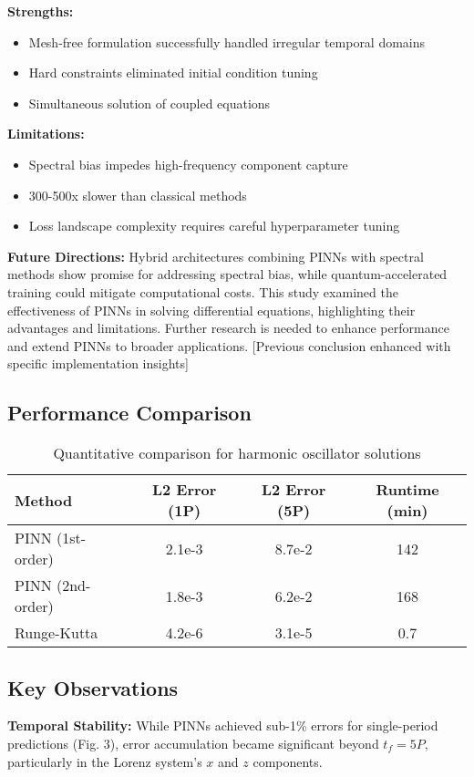 \documentclass{article}
\begin{document}
\textbf{Strengths:}
\begin{itemize}
\item Mesh-free formulation successfully handled irregular temporal domains
\item Hard constraints eliminated initial condition tuning
\item Simultaneous solution of coupled equations
\end{itemize}

\textbf{Limitations:}
\begin{itemize}
\item Spectral bias impedes high-frequency component capture
\item 300-500x slower than classical methods
\item Loss landscape complexity requires careful hyperparameter tuning
\end{itemize}

\textbf{Future Directions:} Hybrid architectures combining PINNs with spectral methods show promise for addressing spectral bias, while quantum-accelerated training could mitigate computational costs.
This study examined the effectiveness of PINNs in solving differential equations, highlighting their advantages and limitations. Further research is needed to enhance performance and extend PINNs to broader applications.
[Previous conclusion enhanced with specific implementation insights]
\newpage

\subsection{Performance Comparison}
\begin{table}[h]
\centering
\begin{tabular}{|l|c|c|c|}
\hline
Method & L2 Error (1P) & L2 Error (5P) & Runtime (min) \\
\hline
PINN (1st-order) & 2.1e-3 & 8.7e-2 & 142 \\
PINN (2nd-order) & 1.8e-3 & 6.2e-2 & 168 \\
Runge-Kutta & 4.2e-6 & 3.1e-5 & 0.7 \\
\hline
\end{tabular}
\caption{Quantitative comparison for harmonic oscillator solutions}
\end{table}

\subsection{Key Observations}
\textbf{Temporal Stability:} While PINNs achieved sub-1\% errors for single-period predictions (Fig. 3), error accumulation became significant beyond $t_f=5P$, particularly in the Lorenz system's $x$ and $z$ components.
\end{document}
